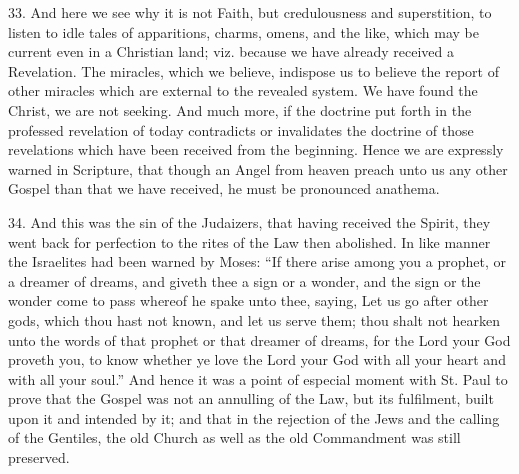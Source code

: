 33. And here we see why it is not Faith, but credulousness and
superstition, to listen to idle tales of apparitions, charms, omens,
and the like, which may be current even in a Christian land; viz.
because we have already received a Revelation. The miracles, which we
believe, indispose us to believe the report of other miracles which
are external to the revealed system. We have found the Christ, we are
not seeking. And much more, if the doctrine put forth in the professed
revelation of today contradicts or invalidates the doctrine of those
revelations which have been received from the beginning. Hence we are
expressly warned in Scripture, that though an Angel from heaven preach
unto us any other Gospel than that we have received, he must be
pronounced anathema.

34. And this was the sin of the Judaizers, that having received the
Spirit, they went back for perfection to the rites of the Law then
abolished. In like manner the Israelites had been warned by Moses:
``If there arise among you a prophet, or a dreamer of dreams, and
giveth thee a sign or a wonder, and the sign or the wonder come to
pass whereof he spake unto thee, saying, Let us go after other gods,
which thou hast not known, and let us serve them; thou shalt not
hearken unto the words of that prophet or that dreamer of dreams, for
the Lord your God proveth you, to know whether ye love the Lord your
God with all your heart and with all your soul.'' And hence it was
a point of especial moment with St. Paul to prove that the Gospel was
not an annulling of the Law, but its fulfilment, built upon it and
intended by it; and that in the rejection of the Jews and the calling
of the Gentiles, the old Church as well as the old Commandment was
still preserved.

